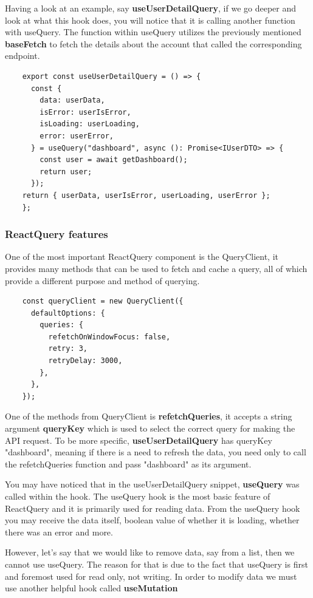 \documentclass[singlespacing,12pt,parskip,headsepline,consistentlayout]{article}
\begin{document}
Having a look at an example, say {\bfseries useUserDetailQuery}, if we go deeper and look at what this hook does, you will notice that it is calling another function with useQuery. The function within useQuery utilizes the previously mentioned {\bfseries baseFetch} to fetch the details about the account that called the corresponding endpoint.

\begin{lstlisting}
    export const useUserDetailQuery = () => {
      const {
        data: userData,
        isError: userIsError,
        isLoading: userLoading,
        error: userError,
      } = useQuery("dashboard", async (): Promise<IUserDTO> => {
        const user = await getDashboard();
        return user;
      });
    return { userData, userIsError, userLoading, userError };
    };
\end{lstlisting}

\subsubsection{ReactQuery features}

One of the most important ReactQuery component is the QueryClient, it provides many methods that can be used to fetch and cache a query, all of which provide a different purpose and method of querying.

\begin{lstlisting}
    const queryClient = new QueryClient({
      defaultOptions: {
        queries: {
          refetchOnWindowFocus: false,
          retry: 3,
          retryDelay: 3000,
        },
      },
    });
\end{lstlisting}

One of the methods from QueryClient is {\bfseries refetchQueries}, it accepts a string argument {\bfseries queryKey} which is used to select the correct query for making the API request. To be more specific, {\bfseries useUserDetailQuery} has queryKey "dashboard", meaning if there is a need to refresh the data, you need only to call the refetchQueries function and pass "dashboard" as its argument.

You may have noticed that in the useUserDetailQuery snippet, {\bfseries useQuery} was called within the hook. The useQuery hook is the most basic feature of ReactQuery and it is primarily used for reading data. From the useQuery hook you may receive the data itself, boolean value of whether it is loading, whether there was an error and more.

However, let's say that we would like to remove data, say from a list, then we cannot use useQuery. The reason for that is due to the fact that useQuery is first and foremost used for read only, not writing. In order to modify data we must use another helpful hook called {\bfseries useMutation}
\end{document}

